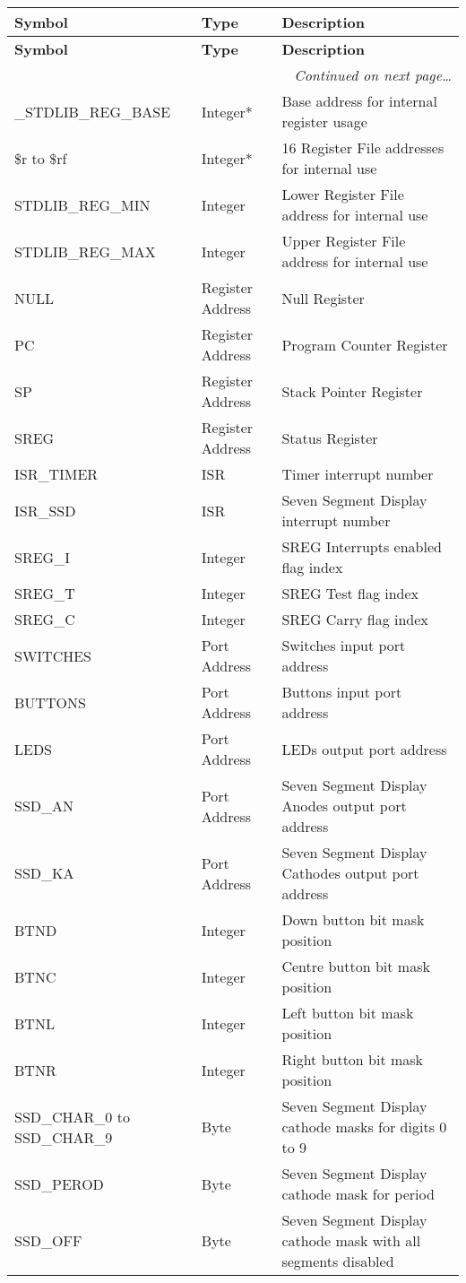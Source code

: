 \documentclass[12pt,twoside]{report}
\begin{document}
{\scriptsize
\begin{longtable}{ | l | l | l | }
  \hline
  \textbf{Symbol} & \textbf{Type} & \textbf{Description} \\
  \hline
\endfirsthead
  \hline
  \textbf{Symbol} & \textbf{Type} & \textbf{Description} \\
  \hline

\endhead
  \hline
  \multicolumn{3}{r}{\emph{Continued on next page\ldots}}
\endfoot

\endlastfoot
 \hline
 \_STDLIB\_USER\_ENTRY\_POINT & Label* & User code entry point \\
 \_STDLIB\_REG\_BASE & Integer* & Base address for internal register usage \\
 \$r to \$rf & Integer* & 16 Register File addresses for internal use \\
 STDLIB\_REG\_MIN & Integer & Lower Register File address for internal use \\
 STDLIB\_REG\_MAX & Integer & Upper Register File address for internal use \\
 NULL & Register Address & Null Register \\
 PC & Register Address & Program Counter Register \\
 SP & Register Address & Stack Pointer Register \\
 SREG & Register Address & Status Register \\
 ISR\_TIMER & ISR & Timer interrupt number \\
 ISR\_SSD & ISR & Seven Segment Display interrupt number \\
 SREG\_I & Integer & SREG Interrupts enabled flag index \\
 SREG\_T & Integer & SREG Test flag index \\
 SREG\_C & Integer & SREG Carry flag index \\
 SWITCHES & Port Address & Switches input port address \\
 BUTTONS & Port Address & Buttons input port address \\
 LEDS & Port Address & LEDs output port address \\
 SSD\_AN & Port Address & Seven Segment Display Anodes output port address \\
 SSD\_KA & Port Address & Seven Segment Display Cathodes output port address \\
 BTND & Integer & Down button bit mask position \\
 BTNC & Integer & Centre button bit mask position \\
 BTNL & Integer & Left button bit mask position \\
 BTNR & Integer & Right button bit mask position \\
 SSD\_CHAR\_0 to SSD\_CHAR\_9 & Byte & Seven Segment Display cathode masks for digits 0 to 9 \\
 SSD\_PEROD & Byte & Seven Segment Display cathode mask for period \\
 SSD\_OFF & Byte & Seven Segment Display cathode mask with all segments disabled \\
 \hline
\end{longtable}}
\end{document}
